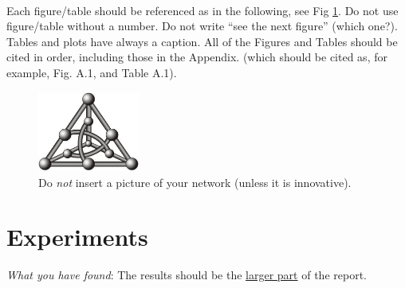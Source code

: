 \documentclass[12pt, letterpaper]{article}  %
\begin{document}
\noindent \\ Each figure/table should be referenced as in the following, see Fig \ref{fig:myfigure}. 
Do not use figure/table without a number. Do not write “see the next figure” (which one?).
Tables and plots have always a caption. All of the Figures and Tables should be cited in order, including those in the Appendix. (which should be cited as, for example, Fig. A.1, and Table A.1).  

\begin{figure}[h]
\centering
\includegraphics[width=0.3\textwidth]{figure.jpg}
\caption{Do \textit{not} insert a picture of your network (unless it is innovative).}
\label{fig:myfigure}
\end{figure}

\newpage
\section{Experiments}
\label{sec:experiments}
\textit{What you have found}: The results should be the \underline{larger part} of the report.
\end{document}

